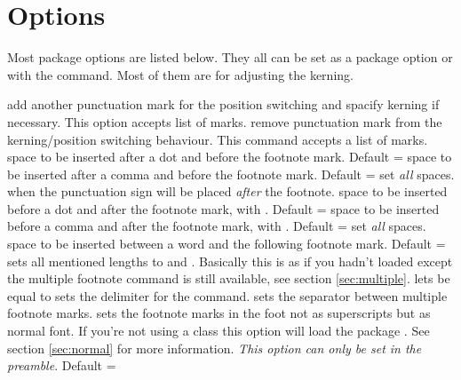 \documentclass[toc=index,toc=bib]{cnpkgdoc}
\begin{document}
\section{Options}\label{sec:options}
Most package options are listed below. They all can be set as a package option or
with the  command. Most of them are for adjusting the kerning.
\begin{beschreibung}
  add another punctuation
 mark for the position switching and spacify kerning if necessary. This option
 accepts list of marks.
  remove punctuation mark from the kerning/position
 switching behaviour. This command accepts a list of marks.
  space to be inserted after a dot and before the
 footnote mark. Default = \code{-.06em}
  space to be inserted after a comma and before
 the footnote mark. Default = \code{-.06em}
  set \emph{all} spaces.
  when  the punctuation sign
 will be placed \emph{after} the footnote.
  space to be inserted before a dot and after the
 footnote mark, \ie with . Default = \code{-.15em}
  space to be inserted before a comma and after
 the footnote mark, \ie with . Default = \code{-.15em}
  set \emph{all} spaces.
  space to be inserted between a word and the
 following footnote mark. Default = \code{.06em}
  sets all mentioned lengths to  and .
 Basically this is as if you hadn't loaded \fnpct except the multiple footnote
 command is still available, see section \ref{sec:multiple}.
  lets  be equal to
  sets the delimiter for the 
 command.
  sets the separator between multiple footnote
 marks.
  sets the footnote marks in the foot
 not as superscripts but as normal font. If you're not using a 
 class this option will load the package . See section \ref{sec:normal}
 for more information. \emph{This option can only be set in the preamble}. Default
 = 
\end{beschreibung}
\end{document}

